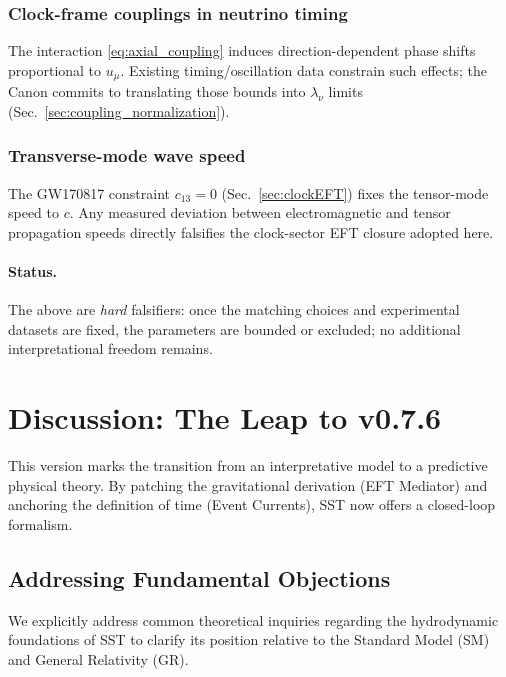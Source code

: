 \documentclass[10pt]{article}
\begin{document}
\subsubsection{Clock-frame couplings in neutrino timing}
The interaction \eqref{eq:axial_coupling} induces direction-dependent phase shifts proportional
to $u_\mu$. Existing timing/oscillation data constrain such effects; the Canon commits to translating
those bounds into $\lambda_\nu$ limits (Sec.~\ref{sec:coupling_normalization}).

\subsubsection{Transverse-mode wave speed}
The GW170817 constraint $c_{13}=0$ (Sec.~\ref{sec:clockEFT}) fixes the tensor-mode speed to $c$.
Any measured deviation between electromagnetic and tensor propagation speeds directly falsifies the
clock-sector EFT closure adopted here.

\paragraph{Status.}
The above are \emph{hard} falsifiers: once the matching choices and experimental datasets are fixed,
the parameters are bounded or excluded; no additional interpretational freedom remains.

\section{Discussion: The Leap to v0.7.6}


This version marks the transition from an interpretative model to a predictive physical theory. By patching the gravitational derivation (EFT Mediator) and anchoring the definition of time (Event Currents), SST now offers a closed-loop formalism.

\subsection*{Addressing Fundamental Objections}
We explicitly address common theoretical inquiries regarding the hydrodynamic foundations of SST to clarify its position relative to the Standard Model (SM) and General Relativity (GR).
\end{document}
